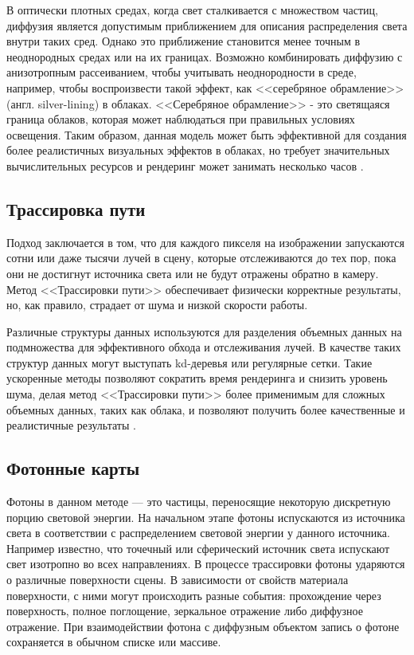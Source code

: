  В оптически плотных средах, когда свет сталкивается с множеством частиц, диффузия является допустимым приближением для описания распределения света внутри таких сред. Однако это приближение становится менее точным в неоднородных средах или на их границах. 
 Возможно комбинировать диффузию с анизотропным рассеиванием, чтобы учитывать неоднородности в среде, например, чтобы воспроизвести такой эффект, как <<серебряное обрамление>> (англ. silver-lining) в облаках. <<Серебряное обрамление>> - это светящаяся граница облаков, которая может наблюдаться при правильных условиях освещения.
 Таким образом, данная модель может быть эффективной для создания более реалистичных визуальных эффектов в облаках, но требует значительных вычислительных ресурсов и рендеринг может занимать несколько часов \cite{clouds}.


\subsection{Трассировка пути}

Подход заключается в том, что для каждого пикселя на изображении запускаются сотни или даже тысячи лучей в сцену, которые отслеживаются до тех пор, пока они не достигнут источника света или не будут отражены обратно в камеру. Метод <<Трассировки пути>> обеспечивает физически корректные результаты, но, как правило, страдает от шума и низкой скорости работы.

Различные структуры данных используются для разделения объемных данных на подмножества для эффективного обхода и отслеживания лучей. В качестве таких структур данных могут выступать kd-деревья или регулярные сетки. Такие ускоренные методы позволяют сократить время рендеринга и снизить уровень шума, делая метод <<Трассировки пути>> более применимым для сложных объемных данных, таких как облака, и позволяют получить более качественные и реалистичные результаты \cite{clouds}.

\subsection{Фотонные карты}

Фотоны в данном методе — это частицы, переносящие некоторую дискретную порцию световой энергии. На начальном этапе фотоны испускаются из источника света в соответствии с распределением световой энергии у данного источника. Например известно, что точечный или сферический источник света испускают свет изотропно во всех направлениях. В  процессе  трассировки  фотоны  ударяются  о  различные  поверхности  сцены.  В 
зависимости от свойств материала поверхности, с ними могут происходить разные события: 
прохождение через поверхность, полное поглощение, зеркальное отражение либо диффузное отражение. При  взаимодействии  фотона  с  диффузным  объектом  запись  о  фотоне 
сохраняется в обычном списке или массиве. 


